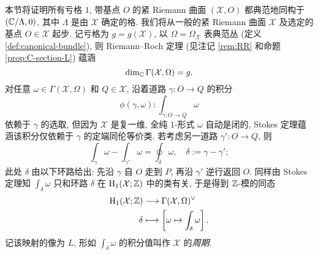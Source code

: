 本节将证明所有亏格 $1$, 带基点 $O$ 的紧 Riemann 曲面 $(\mathcal{X}, O)$ 都典范地同构于 $(\mathbb{C}/\Lambda, 0)$, 其中 $\Lambda$ 是由 $\mathcal{X}$ 确定的格. 我们将从一般的紧 Riemann 曲面 $\mathcal{X}$ 及选定的基点 $O \in \mathcal{X}$ 起步. 记亏格为 $g = g(\mathcal{X})$, 以 $\Omega = \Omega_{\mathcal{X}}$ 表典范丛 (定义 \ref{def:canonical-bundle}), 则 Riemann--Roch 定理 (见注记 \ref{rem:RR} 和命题 \ref{prop:C-section-L}) 蕴涵
\[ \dim_{\mathbb{C}} \Gamma(\mathcal{X}, \Omega) = g. \]
对任意 $\omega \in \Gamma(\mathcal{X}, \Omega)$ 和 $Q \in \mathcal{X}$, 沿着道路 $\gamma: O \to Q$ 的积分
\[ \phi(\gamma, \omega): \int_{\gamma: O \to Q} \omega \]
依赖于 $\gamma$ 的选取, 但因为 $\mathcal{X}$ 是复一维, 全纯 $1$-形式 $\omega$ 自动是闭的, Stokes 定理蕴涵该积分仅依赖于 $\gamma$ 的定端同伦等价类. 若考虑另一道路 $\gamma': O \to Q$, 则
\[ \int_\gamma \omega - \int_{\gamma'} \omega = \oint_\delta \omega, \quad \delta := \gamma - \gamma'; \]
此处 $\delta$ 由以下环路给出: 先沿 $\gamma$ 自 $O$ 走到 $P$, 再沿 $\gamma'$ 逆行返回 $O$. 同样由 Stokes 定理知 $\int_\delta \omega$ 只和环路 $\delta$ 在 $\operatorname{H}_1(\mathcal{X}; \mathbb{Z})$ 中的类有关, 于是得到 $\mathbb{Z}$-模的同态
\begin{equation}\label{eqn:AJ-preparation}\begin{aligned}
	\operatorname{H}_1(\mathcal{X}; \mathbb{Z}) & \longrightarrow \Gamma(\mathcal{X}, \Omega)^\vee \\
	\delta & \longmapsto \left[ \omega \mapsto \int_\delta \omega \right].
\end{aligned}\end{equation}
记该映射的像为 $L$, 形如 $\int_\delta \omega$ 的积分值叫作 $\mathcal{X}$ 的\emph{周期}. 

